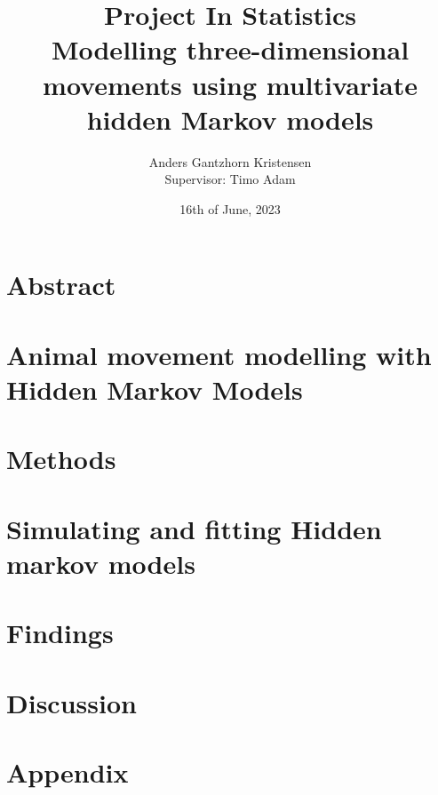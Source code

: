 \documentclass[11pt]{article}
\begin{document}
\pagestyle{fancy}
\fancyfoot{}
\fancyfoot[C]{\thepage}
\renewcommand{\headrulewidth}{0pt}
\renewcommand{\footrulewidth}{0pt}
\allowdisplaybreaks



\title{\vspace{-4cm}Project In Statistics\\
Modelling three-dimensional movements using
multivariate hidden Markov models}
\author{Anders Gantzhorn Kristensen\\
Supervisor: Timo Adam}
\date{16th of June, 2023}
\maketitle
\section*{Abstract}

\newpage
\section{Animal movement modelling with Hidden Markov Models}\label{intro}

\section{Methods}\label{Methods}

\section{Simulating and fitting Hidden markov models}\label{Simulation}

\section{Findings}\label{Application}

\newpage
\section{Discussion}\label{Discussion}

\newpage

\newpage
\appendix
\section*{Appendix}

\end{document}
